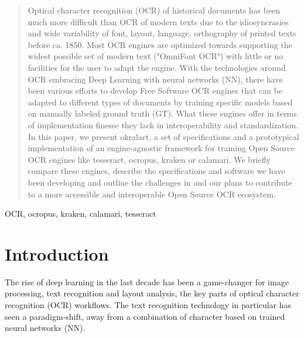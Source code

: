\documentclass[conference]{IEEEtran}
\begin{document}
\begin{abstract}

Optical character recognition (OCR) of historical documents has been much more
difficult than OCR of modern texts due to the idiosyncrasies and wide
variability of font, layout, language, orthography of printed texts before ca.
1850. Most OCR engines are optimized towards supporting the widest possible set
of modern text ("OmniFont OCR") with little or no facilities for the user to
adapt the engine. With the technologies around OCR embracing Deep Learning with
neural networks (NN), there have been various efforts to develop Free Software
OCR engines that can be adapted to different types of documents by training
specific models based on manually labeled ground truth (GT). What these
engines offer in terms of implementation finesse they lack in interoperability
and standardization. In this paper, we present okralact, a set of specifications
and a prototypical implementation of an engine-agnostic framework for training
Open Source OCR engines like tesseract, ocropus, kraken or calamari. We briefly
compare these engines, describe the specifications and software we have been
developing and outline the challenges in and our plans to contribute to
a more accessible and interoperable Open Source OCR ecosystem.

\end{abstract}

\begin{IEEEkeywords}
OCR, ocropus, kraken, calamari, tesseract
\end{IEEEkeywords}

\section*{Introduction}


The rise of deep learning in the last decade has been a game-changer for image
processing, text recognition and layout analysis, the key parts of optical
character recognition (OCR) workflows. The text recognition technology in
particular has seen a paradigm-shift, away from a combination of character
based on trained neural networks (NN).
\end{document}
